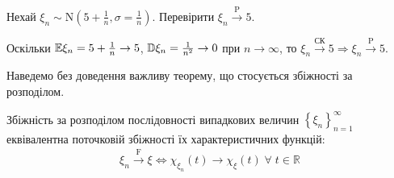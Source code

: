 \begin{example}
    Нехай $\xi_n \sim \mathrm{N}\left(5 + \frac{1}{n}, \sigma = \frac{1}{n}\right)$. Перевірити $\xi_n \overset{\mathrm{P}}{\longrightarrow} 5$.
    
    \noindent Оскільки $\mathbb{E}\xi_n = 5+\frac{1}{n} \to 5$, $\mathbb{D}\xi_n = \frac{1}{n^2} \to 0$ при $n \to \infty$,
    то $\xi_n \overset{\text{СК}}{\longrightarrow} 5 \Rightarrow \xi_n \overset{\mathrm{P}}{\longrightarrow} 5$.
\end{example}

Наведемо без доведення важливу теорему, що стосується збіжності за розподілом.

\begin{theorem*}
    Збіжність за розподілом послідовності випадкових величин $\left\{ \xi_n\right\}_{n=1}^{\infty}$ еквівалентна поточковій збіжності їх
    характеристичних функцій:
    \begin{gather}\label{levi_theor}
        \xi_n \overset{\mathrm{F}}{\longrightarrow} \xi \Longleftrightarrow \chi_{\xi_n}(t) \to \chi_\xi (t) \; \forall \; t\in \mathbb{R}
    \end{gather}
\end{theorem*}